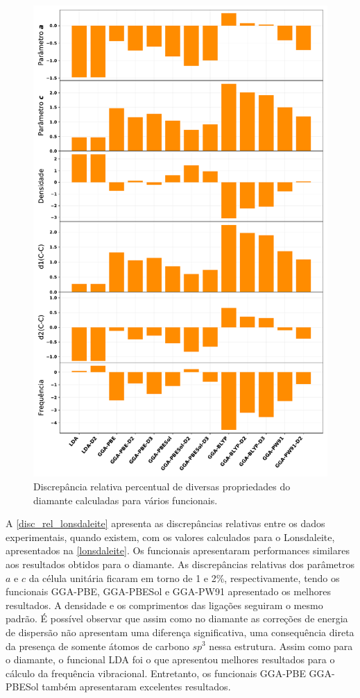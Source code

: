  		\begin{figure}[!h]
	 		\centering
	 		\includegraphics[width=.85\linewidth]{capitulos/fig/results0/disc_rel_lonsdaleite}
	 		\caption{Discrepância relativa percentual de diversas propriedades do diamante calculadas para vários funcionais.}
	 		\label{disc_rel_lonsdaleite}
	 	\end{figure}
 		
 		A \autoref{disc_rel_lonsdaleite} apresenta as discrepâncias relativas entre os dados experimentais, quando existem, com os valores calculados para o Lonsdaleite, apresentados na \autoref{lonsdaleite}. Os funcionais apresentaram performances similares aos resultados obtidos para o diamante. As discrepâncias relativas dos parâmetros $a$ e $c$ da célula unitária ficaram em torno de 1 e 2\%, respectivamente, tendo os funcionais GGA-PBE, GGA-PBESol e GGA-PW91 apresentado os melhores resultados. A densidade e os comprimentos das ligações seguiram o mesmo padrão. É possível observar que assim como no diamante as correções de energia de dispersão não apresentam uma diferença significativa, uma consequência direta da presença de somente átomos de carbono $sp^3$ nessa estrutura. Assim como para o diamante, o funcional LDA foi o que apresentou melhores resultados para o cálculo da frequência vibracional. Entretanto, os funcionais GGA-PBE GGA-PBESol também apresentaram excelentes resultados.
 		
